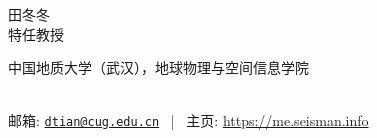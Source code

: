\documentclass[11pt, a4paper]{article}
\makeatletter
\newcommand{\MyName}{田冬冬}
\newcommand{\MyRole}{特任教授}
\newcommand{\Email}{dtian@cug.edu.cn}
\newcommand{\Website}{https://me.seisman.info}
\newcommand{\Affiliation}{
	中国地质大学（武汉），地球物理与空间信息学院
}
\newcommand{\Address}{

}
\newcommand{\makefield}[2]{\makebox[1.5em]{\color{MarkerColour!80!black}#1} #2}
\makeatother
\begin{document}
\thispagestyle{empty}

\begin{center}
    {\fontsize{30pt}{0}\selectfont \MyName}
    \\[0.5cm]
    {\fontsize{18pt}{0}\selectfont \MyRole}
    \\[0.3cm]
    {\fontsize{11pt}{0}\selectfont
        \Affiliation
        \\[0.2cm]
        邮箱: \href{mailto:\Email}{\texttt{\Email}}
        \, | \,
        主页: \url{\Website}
    }
\end{center}











%
\end{document}
